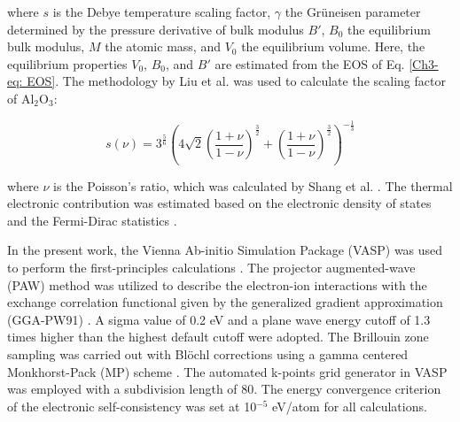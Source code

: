 \noindent where $s$ is the Debye temperature scaling factor, $\gamma$ the Gr\"uneisen parameter determined by the pressure derivative of bulk modulus $B'$, $B_{0}$ the equilibrium bulk modulus, $M$ the atomic mass, and $V_{0}$ the equilibrium volume. Here, the equilibrium properties $V_{0}$, $B_{0}$, and $B'$ are estimated from the EOS of Eq. \ref{Ch3-eq: EOS}. The methodology by Liu et al. \cite{Liu2015} was used to calculate the scaling factor of Al$_{2}$O$_{3}$: 

\begin{equation}
\label{Ch3-eq: scalingfactor}
s(\nu) = 3^{\frac{5}{6}} \left( 4 \sqrt{2} \left(\frac{1+\nu}{1-\nu}\right)^{\frac{3}{2}} + \left(\frac{1+\nu}{1-\nu}\right)^{\frac{3}{2}}\right)^{-\frac{1}{3}}
\end{equation}

\noindent where $\nu$ is the Poisson's ratio, which was calculated by Shang et al. \cite{Shang2007c}. The thermal electronic contribution was estimated based on the electronic density of states and the Fermi-Dirac statistics \cite{Wang2004}.

In the present work, the Vienna Ab-initio Simulation Package (VASP) was used to perform the first-principles calculations \cite{Kresse1996}. The projector augmented-wave (PAW) \cite{Kresse1999,Blochl1994} method was utilized to describe the electron-ion interactions with the exchange correlation functional given by the generalized gradient approximation (GGA-PW91) \cite{Perdew1992}. A sigma value of 0.2 eV and a plane wave energy cutoff of 1.3 times higher than the highest default cutoff were adopted. The Brillouin zone sampling was carried out with Bl\"ochl corrections using a gamma centered Monkhorst-Pack (MP) scheme \cite{Blochl1994,Monkhorst1976a}. The automated k-points grid generator in VASP was employed with a subdivision length of 80. The energy convergence criterion of the electronic self-consistency was set at 10$^{-5}$ eV/atom for all calculations.

